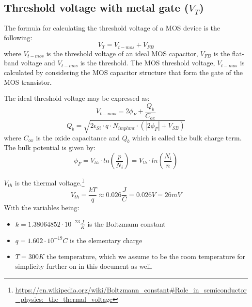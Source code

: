 \subsection{Threshold voltage with metal gate ($V_T$)}
The formula for calculating the threshold voltage of a MOS device is the following:
\begin{equation}
V_T = V_{t-mos} + V_{FB}
\end{equation}
where $V_{t-mos}$ is the threshold voltage of an ideal MOS capacitor, $V_{FB}$ is the flat-band voltage and $V_{t-mos}$ is the threshold.
The MOS threshold voltage, $V_{t-mos}$ is calculated by considering the MOS capacitor structure that form the gate of the MOS transistor.

The ideal threshold voltage may be expressed as:
\begin{equation}
V_{t-mos}=2 \phi_F + \frac{Q_b}{C_{ox}}
\end{equation}
\begin{equation}
Q_b
=
\sqrt{2 \epsilon_{Si} \cdot q \cdot N_{implant}  \cdot  ( \left| 2 \phi_F \right| + V_{SB}) }
\end{equation}
where $C_{ox}$ is the oxide capacitance and $Q_b$ which is called the bulk charge term.\\

The bulk potential is given by:
\begin{equation}
\phi_F
=
V_{th} \cdot ln\left(\frac{p}{N_i}\right)
=
V_{th} \cdot ln\left(\frac{N_i}{n}\right)
\end{equation}

$V_{th}$ is the thermal voltage.\footnote{\url{https://en.wikipedia.org/wiki/Boltzmann_constant\#Role_in_semiconductor_physics:_the_thermal_voltage}}
\begin{equation}
V_{th} = \frac{k T}{q} \approx 0.026 \frac{J}{C} = 0.026 V = 26mV
\end{equation}
With the variables being:
\begin{itemize}
\item $k=1.38064852\cdot 10^{-23}  \frac{J}{K}$ is the Boltzmann constant
\item $q=1.602 \cdot 10^{-19} C$ is the elementary charge
\item $T= 300 K$ the temperature, which we assume to be the room temperature for simplicity further on in this document as well.
\end{itemize}

